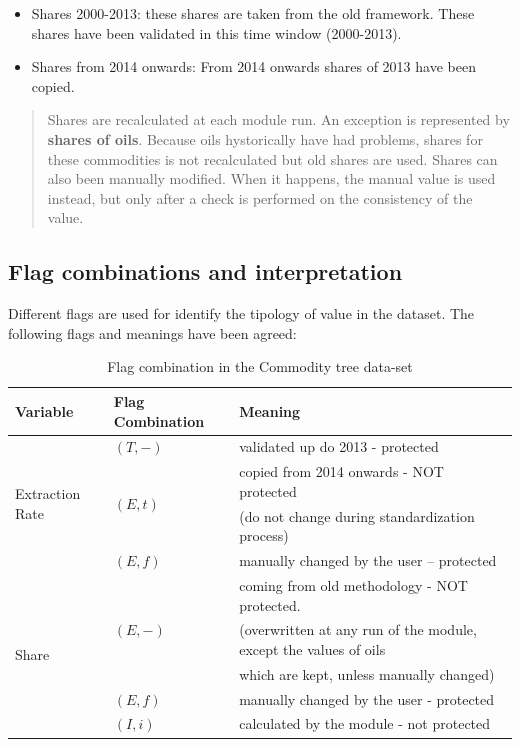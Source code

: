 \documentclass[]{article}
\providecommand{\tightlist}{%
  \setlength{\itemsep}{0pt}\setlength{\parskip}{0pt}}
\begin{document}
\begin{itemize}
\tightlist
\item
  Shares 2000-2013: these shares are taken from the old framework. These
  shares have been validated in this time window (2000-2013).
\item
  Shares from 2014 onwards: From 2014 onwards shares of 2013 have been
  copied.
\end{itemize}

\begin{quote}
Shares are recalculated at each module run. An exception is represented
by \textbf{shares of oils}. Because oils hystorically have had problems,
shares for these commodities is not recalculated but old shares are
used. Shares can also been manually modified. When it happens, the
manual value is used instead, but only after a check is performed on the
consistency of the value.
\end{quote}

\newpage

\subsection{Flag combinations and
interpretation}\label{flag-combinations-and-interpretation}

Different flags are used for identify the tipology of value in the
dataset. The following flags and meanings have been agreed:

\begin{table}[h]
\caption {Flag combination in the Commodity tree data-set}
\centering
\begin{tabular}{|l|l|l|}
\toprule
\bf{Variable} & \bf{Flag Combination} & \bf{Meaning}\\ 
\midrule
\multirow{4}{*}{Extraction Rate} & $(T , -)$  & validated up do 2013 - protected \\
\cline{2-3}
& \multirow{2}{*}{$(E , t)$}  &   copied from 2014 onwards - NOT protected \\
& &  (do not change during standardization process)\\ 
\cline{2-3}
& $(E , f)$  &   manually changed by the user – protected\\ 
\cline{1-3}
\multirow{5}{*}{Share} & \multirow{3}{*}{$(E , -)$}  & coming from old methodology - NOT protected.\\
& &  (overwritten at any run of the module, except the values of oils\\
& &   which are kept, unless manually changed) \\
\cline{2-3}
& $(E , f)$  &  manually changed by the user - protected\\ 
\cline{2-3}
& $(I , i)$  &   calculated by the module - not protected\\ 
\cline{1-3}
\end{tabular}
\end{table}
\end{document}
